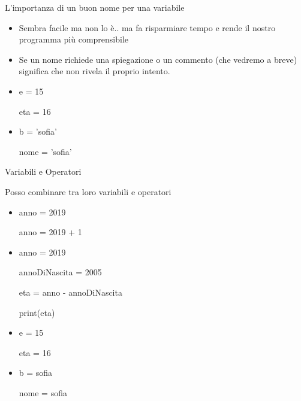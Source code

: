 \begin{frame}
    \begin{block}{L'importanza di un buon nome per una variabile}
        \begin{itemize}
            \item Sembra facile ma non lo è.. ma fa risparmiare tempo e rende il nostro programma più comprensibile
            \item Se un nome richiede una spiegazione o un commento (che vedremo a breve) significa che non rivela il proprio intento.
            \item e = 15
            
            eta = 16
            \item
            b = 'sofia'
            
            nome = 'sofia'
        \end{itemize}
    \end{block}
\end{frame}

\begin{frame}{Variabili e Operatori}
    \begin{block}{Posso combinare tra loro variabili e operatori}
        \begin{itemize}
            \item anno = 2019
            
            anno = 2019 + 1
            \item
            anno = 2019
            
            annoDiNascita = 2005 
            
            eta = anno - annoDiNascita
            
            print(eta)
            \item e = 15
            
            eta = 16
            \item
            b = sofia
            
            nome = sofia
        \end{itemize}
    \end{block}
\end{frame}